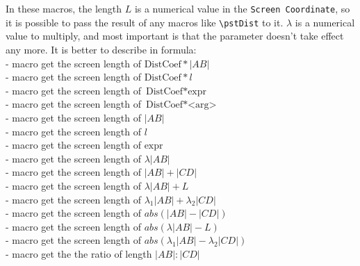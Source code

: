 \documentclass[11pt,english,BCOR=10mm,DIV=12,bibliography=totoc,parskip=false,headings=small,
    headinclude=false,footinclude=false,twoside,english]{pst-doc}
\begin{document}
\begin{BDef}
\Largb{$\lambda$}\\
\\
\Largb{$\lambda$}\\
\\
\\
\Largb{$\lambda$}\\
\\
\end{BDef}

In these macros, the length $L$ is a numerical value in the \texttt{Screen Coordinate},
so it is possible to pass the result of any macros like \verb|\pstDist| to it.
$\lambda$ is a numerical value to multiply, and most important is that the parameter
 doesn't take effect any more.
It is better to describe in formula:
\\
- macro  get the screen length of $\text{DistCoef}*|AB|$\\
- macro  get the screen length of $\text{DistCoef}*l$\\
- macro  get the screen length of $\text{DistCoef}*\text{expr}$\\
- macro  get the screen length of $\text{DistCoef}*\text{<arg>}$\\
- macro  get the screen length of $|AB|$\\
- macro  get the screen length of $l$\\
- macro  get the screen length of $\text{expr}$\\
- macro  get the screen length of $\lambda{}|AB|$\\
- macro  get the screen length of $|AB|+|CD|$\\
- macro  get the screen length of $\lambda{}|AB|+L$\\
- macro  get the screen length of $\lambda_1{}|AB|+\lambda_2{}|CD|$\\
- macro  get the screen length of $abs(|AB|-|CD|)$\\
- macro  get the screen length of $abs(\lambda{}|AB|-L)$\\
- macro  get the screen length of $abs(\lambda_1{}|AB|-\lambda_2{}|CD|)$\\
- macro  get the the ratio of length $|AB|:|CD|$
\end{document}
